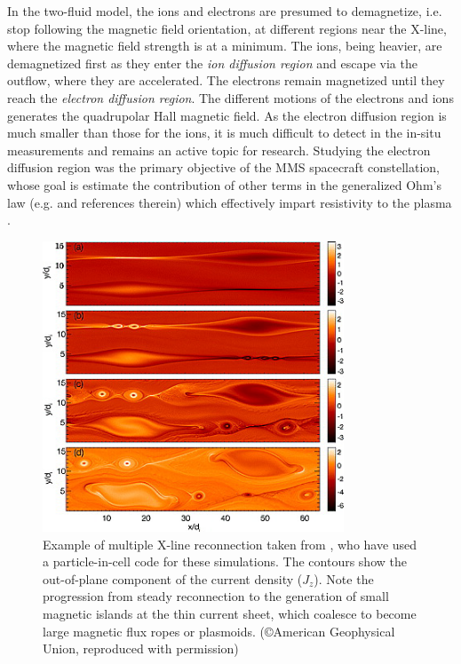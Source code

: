In the two-fluid model, the ions and electrons are presumed to demagnetize, i.e. stop following the magnetic field orientation, at different regions near the X-line, where the magnetic field strength is at a minimum. The ions, being heavier, are demagnetized first as they enter the \emph{ion diffusion region} and escape via the outflow, where they are accelerated. The electrons remain magnetized until they reach the \emph{electron diffusion region}. The different motions of the electrons and ions generates the quadrupolar Hall magnetic field. As the electron diffusion region is much smaller than those for the ions, it is much difficult to detect in the in-situ measurements and remains an active topic for research. Studying the electron diffusion region was the primary objective of the MMS spacecraft constellation, whose goal is estimate the contribution of other terms in the generalized Ohm's law (e.g.  and references therein) which effectively impart resistivity to the plasma \cite{Burch2016MagnetosphericObjectives}.  

\begin{figure}
    \centering
    \includegraphics[width=0.8\textwidth]{images1/reconnection-multiplexline-example.png}
    \caption{Example of multiple X-line reconnection taken from \protect{}, who have used a particle-in-cell code for these simulations. The contours show the out-of-plane component of the current density ($J_z$). Note the progression from steady reconnection to the generation of small magnetic islands at the thin current sheet, which coalesce to become large magnetic flux ropes or plasmoids. (\copyright American Geophysical Union, reproduced with permission)}
    \label{fig:example-multiplexline-reconnection}
\end{figure}

